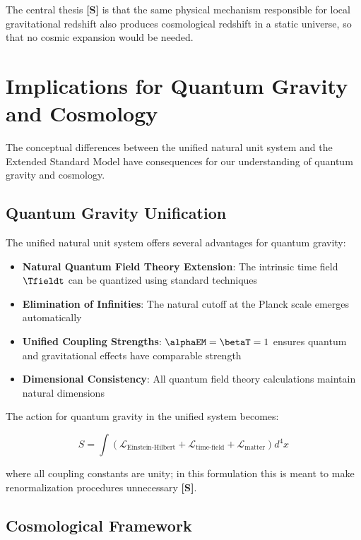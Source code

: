 	The central thesis \textbf{[S]} is that the same physical mechanism responsible for local gravitational redshift also produces cosmological redshift in a static universe, so that no cosmic expansion would be needed.
	
	\section{Implications for Quantum Gravity and Cosmology}
	\label{sec:implications}
	
	The conceptual differences between the unified natural unit system and the Extended Standard Model have consequences for our understanding of quantum gravity and cosmology.
	
	\subsection{Quantum Gravity Unification}
	\label{subsec:quantum_gravity_unification}
	
	The unified natural unit system offers several advantages for quantum gravity:
	
	\begin{itemize}
		\item \textbf{Natural Quantum Field Theory Extension}: The intrinsic time field $\Tfieldt$ can be quantized using standard techniques
		\item \textbf{Elimination of Infinities}: The natural cutoff at the Planck scale emerges automatically
		\item \textbf{Unified Coupling Strengths}: $\alphaEM = \betaT = 1$ ensures quantum and gravitational effects have comparable strength
		\item \textbf{Dimensional Consistency}: All quantum field theory calculations maintain natural dimensions \cite{pascher_lagrangian_2025}
	\end{itemize}
	
	The action for quantum gravity in the unified system becomes:
	
	\begin{equation}
		S = \int \left( \mathcal{L}_{\text{Einstein-Hilbert}} + \mathcal{L}_{\text{time-field}} + \mathcal{L}_{\text{matter}} \right) d^4x
	\end{equation}
	
	where all coupling constants are unity; in this formulation this is meant to make renormalization procedures unnecessary \textbf{[S]}.
	
	\subsection{Cosmological Framework}
	\label{subsec:cosmological_framework}
	
